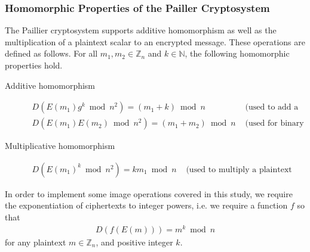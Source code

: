 \subsubsection{Homomorphic Properties of the Pailler Cryptosystem}
The Paillier cryptosystem supports additive homomorphism as well as the multiplication of a plaintext scalar to an encrypted message. These operations are defined as follows.
For all $m_1,m_2 \in \mathbb{Z}_n$ and $k\in \mathbb{N}$, the following homomorphic properties hold.
\begin{description}
  \item[Additive homomorphism]
  \begin{align*}
    D(E(m_1)g^k\bmod n^2)=(m_1+k)\bmod n & \text{ (used to add a constant)}\\
    D(E(m_1)E(m_2)\bmod n^2)=(m_1+m_2)\bmod n & \text{ (used for binary addition)}
  \end{align*}
  \item[Multiplicative homomorphism]
  \begin{align*}
    D(E(m_1)^k\bmod n^2)= km_1\bmod n & \text{ (used to multiply a plaintext constant)}
  \end{align*}
\end{description}
In order to implement some image operations covered in this study, we require the exponentiation of ciphertexts to integer powers, i.e. we require a function $f$ so that
\begin{align*}
	D(f(E(m))) = m^k\bmod n
\end{align*}
for any plaintext $m \in \mathbb{Z}_n$, and positive integer $k$.



